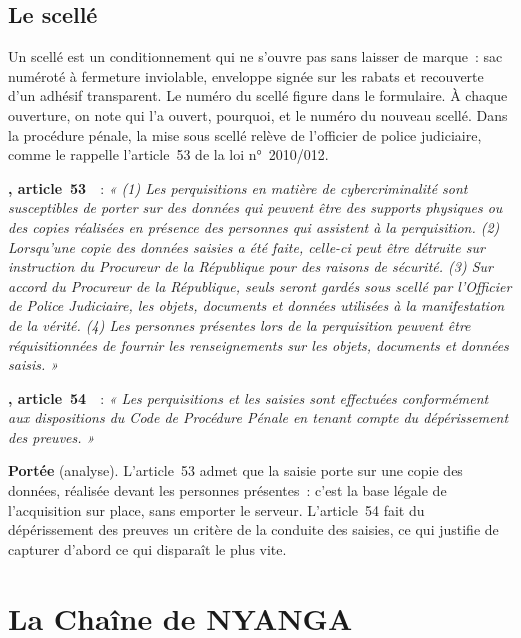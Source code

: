 \subsection{Le scellé}

Un scellé est un conditionnement qui ne s'ouvre pas sans laisser de marque~:
sac numéroté à fermeture inviolable, enveloppe signée sur les rabats et
recouverte d'un adhésif transparent. Le numéro du scellé figure dans le
formulaire. À chaque ouverture, on note qui l'a ouvert, pourquoi, et le
numéro du nouveau scellé. Dans la procédure pénale, la mise sous scellé
relève de l'officier de police judiciaire, comme le rappelle l'article~53 de
la loi n°~2010/012.

\begin{boxjuris}
\textbf{, article~53}~\cite{loi2010012}~:
\textit{« (1) Les perquisitions en matière de cybercriminalité sont
susceptibles de porter sur des données qui peuvent être des supports
physiques ou des copies réalisées en présence des personnes qui assistent à
la perquisition. (2) Lorsqu'une copie des données saisies a été faite,
celle-ci peut être détruite sur instruction du Procureur de la République
pour des raisons de sécurité. (3) Sur accord du Procureur de la République,
seuls seront gardés sous scellé par l'Officier de Police Judiciaire, les
objets, documents et données utilisées à la manifestation de la vérité.
(4) Les personnes présentes lors de la perquisition peuvent être
réquisitionnées de fournir les renseignements sur les objets, documents et
données saisis. »}

\medskip
\textbf{, article~54}~\cite{loi2010012}~:
\textit{« Les perquisitions et les saisies sont effectuées conformément aux
dispositions du Code de Procédure Pénale en tenant compte du dépérissement
des preuves. »}

\medskip
\textbf{Portée} (analyse). L'article~53 admet que la saisie porte sur une
copie des données, réalisée devant les personnes présentes~: c'est la base
légale de l'acquisition sur place, sans emporter le serveur. L'article~54
fait du dépérissement des preuves un critère de la conduite des saisies, ce
qui justifie de capturer d'abord ce qui disparaît le plus vite.
\end{boxjuris}

\section{La Chaîne de NYANGA}
\label{sec:c02-nyanga}

